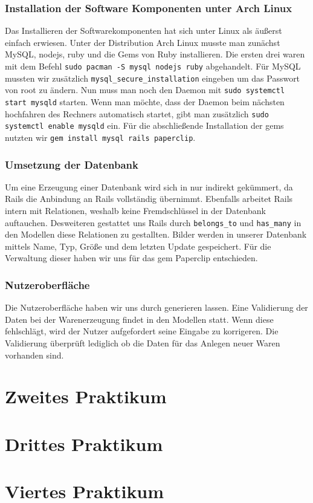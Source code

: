 \documentclass[pdftex,10pt,a4paper]{article}
\begin{document}
\subsubsection{Installation der Software Komponenten unter Arch Linux}
Das Installieren der Softwarekomponenten hat sich unter Linux als \"au{\ss}erst einfach erwiesen. Unter der Distribution Arch Linux musste man zun\"achst MySQL, nodejs, ruby und die Gems von Ruby installieren. Die ersten drei waren mit dem Befehl \texttt{sudo pacman -S mysql nodejs ruby} abgehandelt. F\"ur MySQL mussten wir  zus\"atzlich \texttt{mysql\_secure\_installation} eingeben um das Passwort von root zu \"andern. Nun muss man noch den Daemon mit \texttt{sudo systemctl start mysqld} starten. Wenn man m\"ochte, dass der Daemon beim n\"achsten hochfahren des Rechners automatisch startet, gibt man zus\"atzlich \texttt{sudo systemctl enable mysqld} ein. F\"ur die abschlie{\ss}ende Installation der gems nutzten wir \texttt{gem install mysql rails paperclip}. 

\subsubsection{Umsetzung der Datenbank}
Um eine Erzeugung einer Datenbank wird sich in nur indirekt gek\"ummert, da Rails die Anbindung an Rails vollst\"andig \"ubernimmt. Ebenfalls arbeitet Rails intern mit Relationen, weshalb keine Fremdschl\"ussel in der Datenbank auftauchen. Desweiteren gestattet uns Rails durch \texttt{belongs\_to} und \texttt{has\_many} in den Modellen diese Relationen zu gestallten. Bilder werden in unserer Datenbank mittels Name, Typ, Gr\"o{\ss}e und dem letzten Update gespeichert. F\"ur die Verwaltung dieser haben wir uns f\"ur das gem Paperclip entschieden. 

\subsubsection{Nutzeroberfl\"ache}
Die Nutzeroberfl\"ache haben wir uns durch generieren lassen. Eine Validierung der Daten bei der Warenerzeugung findet in den Modellen statt. Wenn diese fehlschl\"agt, wird der Nutzer aufgefordert seine Eingabe zu korrigeren. Die Validierung \"uberpr\"uft lediglich ob die Daten f\"ur das Anlegen neuer Waren vorhanden sind.  

\section{Zweites Praktikum}

\section{Drittes Praktikum}

\section{Viertes Praktikum}



\end{document}
